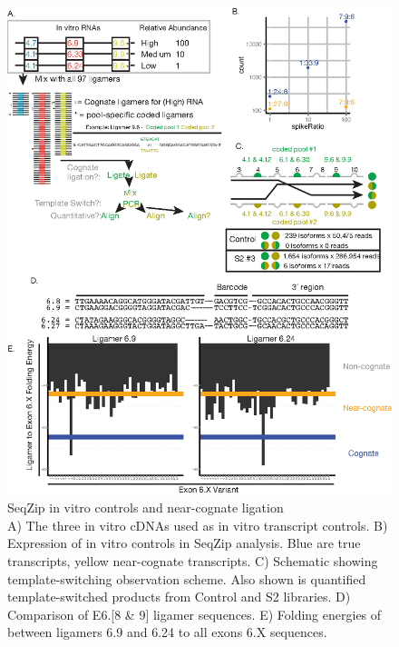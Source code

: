 		\begin{figure} %
			\centering 
			\includegraphics{Figures/SeqZipPaper/Roy2014FigS2.eps}
			\caption[SeqZip in vitro \dscam{} controls and near-cognate ligation]
			{
				SeqZip in vitro \dscam{} controls and near-cognate ligation\\[0.25cm]
				A) The three in vitro cDNAs used as in vitro transcript controls. B) Expression of in vitro controls in SeqZip analysis. Blue are true transcripts, yellow near-cognate transcripts. C) Schematic showing template-switching observation scheme. Also shown is quantified template-switched products from Control and S2 libraries. D) Comparison of E6.[8 & 9] ligamer sequences. E) Folding energies of between ligamers 6.9 and 6.24 to all exons 6.X sequences.
				}
			\label{SeqZipPaper:fig:Roy2014 S2}
			\end{figure}

